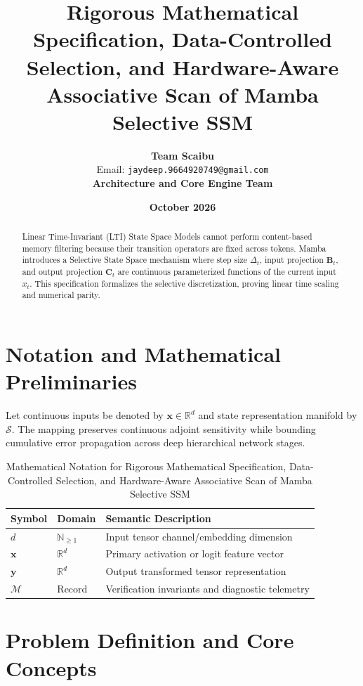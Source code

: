 \documentclass[11pt,a4paper]{article}
\title{\textbf{Rigorous Mathematical Specification, Data-Controlled Selection, and Hardware-Aware Associative Scan of Mamba Selective SSM}}
\author{\textbf{Team Scaibu} \\ \small Email: \texttt{jaydeep.9664920749@gmail.com} \\ \small \textbf{Architecture and Core Engine Team}}
\date{\textbf{October 2026}}
\theoremstyle{definition}
\begin{document}
\maketitle

\begin{abstract}
Linear Time-Invariant (LTI) State Space Models cannot perform content-based memory filtering because their transition operators are fixed across tokens. Mamba introduces a Selective State Space mechanism where step size $\Delta_t$, input projection $\mathbf{B}_t$, and output projection $\mathbf{C}_t$ are continuous parameterized functions of the current input $x_t$. This specification formalizes the selective discretization, proving linear time scaling and numerical parity.
\end{abstract}

\section{Notation and Mathematical Preliminaries}

Let continuous inputs be denoted by $\mathbf{x} \in \mathbb{R}^d$ and state representation manifold by $\mathcal{S}$. The mapping preserves continuous adjoint sensitivity while bounding cumulative error propagation across deep hierarchical network stages.

\begin{table}[h]
\centering
\caption{Mathematical Notation for Rigorous Mathematical Specification, Data-Controlled Selection, and Hardware-Aware Associative Scan of Mamba Selective SSM}
\begin{tabular}{lll}
\toprule
\textbf{Symbol} & \textbf{Domain} & \textbf{Semantic Description} \\
\midrule
$d$ & $\mathbb{N}_{\ge 1}$ & Input tensor channel/embedding dimension \\
$\mathbf{x}$ & $\mathbb{R}^d$ & Primary activation or logit feature vector \\
$\mathbf{y}$ & $\mathbb{R}^d$ & Output transformed tensor representation \\
$\mathcal{M}$ & Record & Verification invariants and diagnostic telemetry \\
\bottomrule
\end{tabular}
\end{table}

\section{Problem Definition and Core Concepts}
\end{document}
